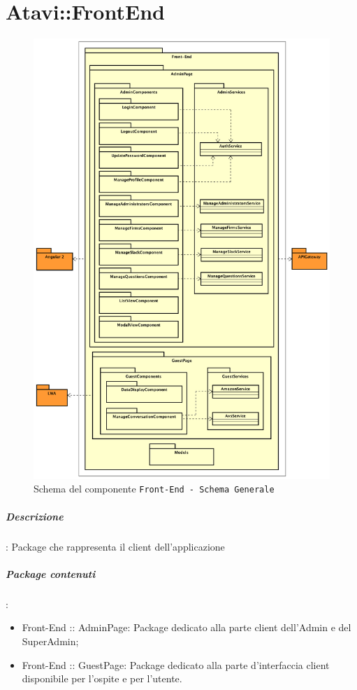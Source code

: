 \documentclass[../ManualeSviluppatore_v2.0.0.tex]{subfiles}
\begin{document}
\section{Atavi::FrontEnd}

	\begin{figure}[!h]
		\centering
		\includegraphics[scale=0.3]{Architettura/Front-end.png}
		\caption{Schema del componente \texttt{Front-End - Schema Generale}}
	\end{figure}
	\subparagraph{Descrizione}: Package che rappresenta il client dell'applicazione
	\subparagraph{Package contenuti}:
	\begin{itemize}
		\item Front-End :: AdminPage: Package dedicato alla parte client dell'Admin e del SuperAdmin;
		\item Front-End :: GuestPage: Package dedicato alla parte d'interfaccia client disponibile per l'ospite e per l'utente.
	\end{itemize}
\end{document}
